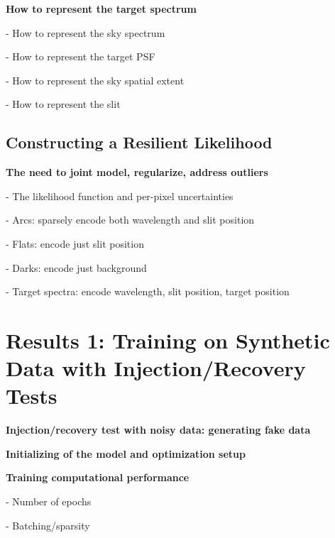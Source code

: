 \documentclass[twocolumn]{aastex631}
\begin{document}
\begin{mdframed}
  \textbf{How to represent the target spectrum} \par
  - How to represent the sky spectrum\par
  - How to represent the target PSF\par
  - How to represent the sky spatial extent\par
  - How to represent the slit\par
\end{mdframed}


\subsection{Constructing a Resilient Likelihood}
\begin{mdframed}
  \textbf{The need to joint model, regularize, address outliers} \par
  - The likelihood function and per-pixel uncertainties\par
  - Arcs: sparsely encode both wavelength and slit position\par
  - Flats: encode just slit position\par
  - Darks: encode just background\par
  - Target spectra: encode wavelength, slit position, target position\par
  \textcolor{lightgray}{\lipsum[7]}
\end{mdframed}


\section{Results 1: Training on Synthetic Data with Injection/Recovery Tests} \label{results1Synthetic}

\begin{mdframed}
  \textbf{Injection/recovery test with noisy data: generating fake data} \par
  \textcolor{lightgray}{\lipsum[9]}
\end{mdframed}

\begin{mdframed}
  \textbf{Initializing of the model and optimization setup} \par
  \textcolor{lightgray}{\lipsum[10]}
\end{mdframed}


\begin{mdframed}
  \textbf{Training computational performance} \par
  - Number of epochs\par
  - Batching/sparsity\par
  \textcolor{lightgray}{\lipsum[9]}
\end{mdframed}
\end{document}
